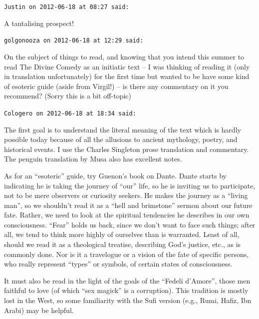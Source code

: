 \begin{footnotesize}
\begin{sffamily}
\texttt{Justin on 2012-06-18 at 08:27 said:}

A tantalising prospect!

\hfill

\texttt{golgonooza on 2012-06-18 at 12:29 said:}

On the subject of things to read, and knowing that you intend this summer to read The Divine Comedy as an initiatic text -- I was thinking of reading it (only in translation unfortunately) for the first time but wanted to be have some kind of esoteric guide (aside from Virgil!) -- is there any commentary on it you recommend? (Sorry this is a bit off-topic)

\hfill

\texttt{Cologero on 2012-06-18 at 18:34 said:}

The first goal is to understand the literal meaning of the text which is hardly possible today because of all the allusions to ancient mythology, poetry, and historical events. I use the Charles Singleton prose translation and commentary. The penguin translation by Musa also has excellent notes.

As for an ``esoteric'' guide, try Guenon's book on Dante. Dante starts by indicating he is taking the journey of ``our'' life, so he is inviting us to participate, not to be mere observers or curiosity seekers. He makes the journey as a ``living man'', so we shouldn't read it as a ``hell and brimstone'' sermon about our future fate. Rather, we need to look at the spiritual tendencies he describes in our own consciousness. ``Fear'' holds us back, since we don't want to face such things; after all, we tend to think more highly of ourselves than is warranted. Least of all, should we read it as a theological treatise, describing God's justice, etc., as is commonly done. Nor is it a travelogue or a vision of the fate of specific persons, who really represent ``types'' or symbols, of certain states of consciousness.

It must also be read in the light of the goals of the ``Fedeli d'Amore'', those men faithful to love (of which ``sex magick'' is a corruption). This tradition is mostly lost in the West, so some familiarity with the Sufi version (e.g., Rumi, Hafiz, Ibn Arabi) may be helpful.

\end{sffamily}
\end{footnotesize}

